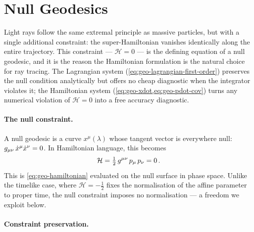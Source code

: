 \section{Null Geodesics}
\label{sec:geo-null}

Light rays follow the same extremal principle as massive particles, but with
a single additional constraint: the super-Hamiltonian vanishes identically
along the entire trajectory.  This constraint --- $\mathcal{H} = 0$ ---
is the defining equation of a null geodesic, and it is the reason the
Hamiltonian formulation is the natural choice for ray tracing.  The
Lagrangian system (\cref{eq:geo-lagrangian-first-order}) preserves the null
condition analytically but offers no cheap diagnostic when the integrator
violates it; the Hamiltonian system (\cref{eq:geo-xdot,eq:geo-pdot-cov})
turns any numerical violation of $\mathcal{H} = 0$ into a free accuracy
diagnostic.

\paragraph{The null constraint.}

A null geodesic is a curve $x^\mu(\lambda)$ whose tangent vector is
everywhere null: $g_{\mu\nu}\,\dot{x}^\mu\dot{x}^\nu = 0$.  In Hamiltonian
language, this becomes
%
\begin{equation}
  \mathcal{H} = \tfrac{1}{2}\,g^{\mu\nu}\,p_\mu\,p_\nu = 0 \,.
  \label{eq:null-constraint}
\end{equation}
%
This is \cref{eq:geo-hamiltonian} evaluated on the null surface in
phase space.  Unlike the timelike case, where $\mathcal{H} = -\tfrac{1}{2}$
fixes the normalisation of the affine parameter to proper time, the null
constraint imposes no normalisation --- a freedom we exploit below.

\paragraph{Constraint preservation.}

